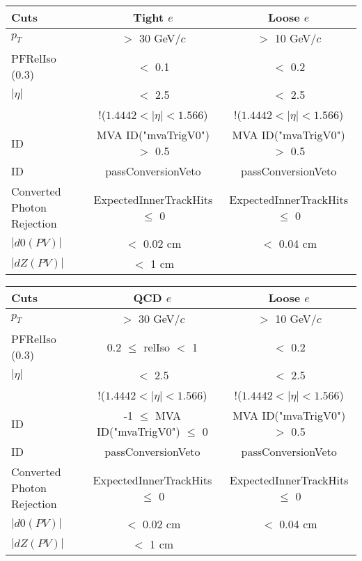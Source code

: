 \documentclass[landscape]{article}
\begin{document}
\begin{small}
  
  \begin{center}

    \begin{tabular}{ | l | c | c | }
      \hline \hline
      Cuts & Tight $e$ & Loose $e$ \\ \hline
      $p_{T}$ & $>$ 30 GeV/$c$ & $>$ 10 GeV/$c$ \\ \hline
      PFRelIso (0.3) & $<$ 0.1 & $<$ 0.2 \\ \hline
      $|\eta|$ & $<$ 2.5 & $<$ 2.5 \\
       & !($1.4442 < |\eta| < 1.566$) & !($1.4442 < |\eta| < 1.566$) \\ \hline
      ID & MVA ID("mvaTrigV0") $>$ 0.5 & MVA ID("mvaTrigV0") $>$ 0.5 \\ \hline
      ID & passConversionVeto & passConversionVeto \\ \hline
      Converted Photon Rejection & ExpectedInnerTrackHits $\leq$ 0 & ExpectedInnerTrackHits $\leq$ 0 \\ \hline
      $|d0(PV)|$ & $<$ 0.02 cm & $<$ 0.04 cm \\ \hline
      $|dZ(PV)|$ & $<$ 1 cm & \\
      \hline \hline
    \end{tabular}

    \vspace{10 mm}

    \begin{tabular}{ | l | c | c | }
      \hline \hline
      Cuts & QCD $e$ & Loose $e$ \\ \hline
      $p_{T}$ & $>$ 30 GeV/$c$ & $>$ 10 GeV/$c$ \\ \hline
      PFRelIso (0.3) & 0.2 $\leq$ relIso $<$ 1 & $<$ 0.2 \\ \hline
      $|\eta|$ & $<$ 2.5 & $<$ 2.5 \\
       & !($1.4442 < |\eta| < 1.566$) & !($1.4442 < |\eta| < 1.566$) \\ \hline
      ID & -1 $\leq$ MVA ID("mvaTrigV0") $\leq$ 0 & MVA ID("mvaTrigV0") $>$ 0.5 \\ \hline
      ID & passConversionVeto & passConversionVeto \\ \hline
      Converted Photon Rejection & ExpectedInnerTrackHits $\leq$ 0 & ExpectedInnerTrackHits $\leq$ 0 \\ \hline
      $|d0(PV)|$ & $<$ 0.02 cm & $<$ 0.04 cm \\ \hline
      $|dZ(PV)|$ & $<$ 1 cm & \\
      \hline \hline
    \end{tabular}


\end{center}
\end{small}
\end{document}
